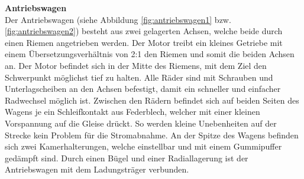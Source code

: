 \documentclass[../../main.tex]{subfiles}
\begin{document}
\textbf{Antriebswagen}\\
Der Antriebswagen (siehe Abbildung \ref{fig:antriebswagen1} bzw. \ref{fig:antriebswagen2}) besteht aus zwei gelagerten Achsen, welche beide durch einen Riemen angetrieben werden. Der Motor treibt ein kleines Getriebe mit einem Übersetzungsverhältnis von 2:1 den Riemen und somit die beiden Achsen an. Der Motor befindet sich in der Mitte des Riemens, mit dem Ziel den Schwerpunkt möglichst tief zu halten. Alle Räder sind mit Schrauben und Unterlagscheiben an den Achsen befestigt, damit ein schneller und einfacher Radwechsel möglich ist. Zwischen den Rädern befindet sich auf beiden Seiten des Wagens je ein Schleifkontakt aus Federblech, welcher mit einer kleinen Vorspannung auf die Gleise drückt. So werden kleine Unebenheiten auf der Strecke kein Problem für die Stromabnahme. An der Spitze des Wagens befinden sich zwei Kamerhalterungen, welche einstellbar und mit einem Gummipuffer gedämpft sind. Durch einen Bügel und einer Radiallagerung ist der Antriebswagen mit dem Ladungsträger verbunden.\\
\end{document}
